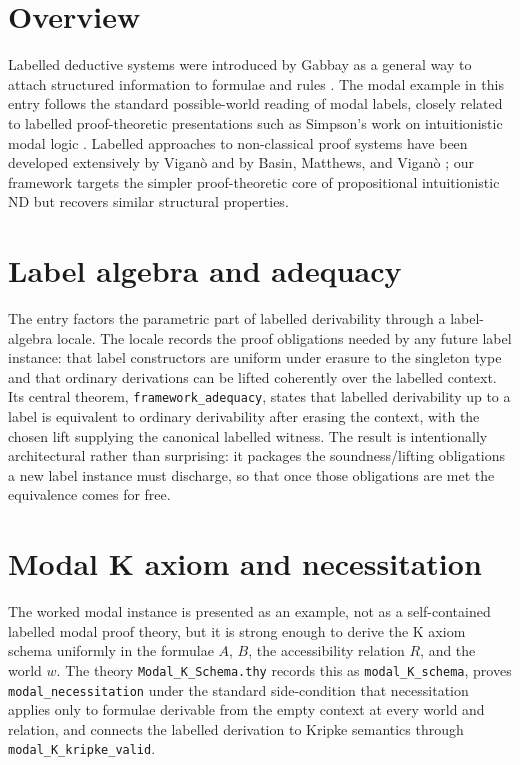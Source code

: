 \documentclass[11pt,a4paper]{article}
\begin{document}
\section{Overview}
Labelled deductive systems were introduced by Gabbay as a general way to attach
structured information to formulae and rules \cite{gabbay-lds}.  The modal
example in this entry follows the standard possible-world reading of modal
labels, closely related to labelled proof-theoretic presentations such as
Simpson's work on intuitionistic modal logic \cite{simpson-modal}. Labelled
approaches to non-classical proof systems have been developed extensively by
Vigan\`o \cite{vigano-labelled-modal} and by Basin, Matthews, and
Vigan\`o \cite{basin-vigano-labelled}; our framework targets the simpler
proof-theoretic core of propositional intuitionistic ND but recovers similar
structural properties.

\section{Label algebra and adequacy}
The entry factors the parametric part of labelled derivability through a
label-algebra locale.  The locale records the proof obligations needed by
any future label instance: that label constructors are uniform under erasure
to the singleton type and that ordinary derivations can be lifted coherently
over the labelled context.  Its central theorem,
\texttt{framework\_adequacy}, states that labelled derivability up to a label
is equivalent to ordinary derivability after erasing the context, with the
chosen lift supplying the canonical labelled witness.  The result is
intentionally architectural rather than surprising: it packages the
soundness/lifting obligations a new label instance must discharge, so that
once those obligations are met the equivalence comes for free.

\section{Modal K axiom and necessitation}
\begin{sloppypar}
The worked modal instance is presented as an example, not as a self-contained
labelled modal proof theory, but it is strong enough to derive the K axiom
schema uniformly in the formulae \(A\), \(B\), the accessibility relation
\(R\), and the world \(w\).  The theory \texttt{Modal\_K\_Schema.thy} records
this as \texttt{modal\_K\_schema}, proves \texttt{modal\_necessitation} under
the standard side-condition that necessitation applies only to formulae
derivable from the empty context at every world and relation, and connects
the labelled derivation to Kripke semantics through
\texttt{modal\_K\_kripke\_valid}.
\end{sloppypar}
\end{document}
